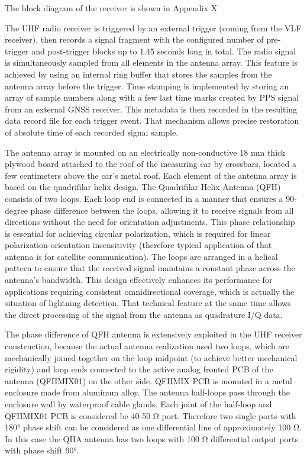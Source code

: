 The block diagram of the receiver is shown in Appendix X


The UHF radio receiver is triggered by an external trigger (coming from the VLF receiver), then records a signal fragment with the configured number of pre-trigger and post-trigger blocks up to 1.45 seconds long in total. The radio signal is simultaneously sampled from all elements in the antenna array. This feature is achieved by using an internal ring buffer that stores the samples from the antenna array before the trigger. Time stamping is implemented by storing an array of sample numbers along with a few last time marks created by PPS signal from an external GNSS receiver. This metadata is then recorded in the resulting data record file for each trigger event. That mechanism allows precise restoration of absolute time of each recorded signal sample. 

The antenna array is mounted on an electrically non-conductive 18 mm thick plywood board attached to the roof of the measuring car by crossbars, located a few centimeters above the car’s metal roof. Each element of the antenna array is based on the quadrifilar helix design. The Quadrifilar Helix Antenna (QFH) consists of two loops. Each loop end is connected in a manner that ensures a 90-degree phase difference between the loops, allowing it to receive signals from all directions without the need for orientation adjustments. This phase relationship is essential for achieving circular polarization, which is required for linear polarization orientation insensitivity (therefore typical application of that antenna is for satellite communication). The loops are arranged in a helical pattern to ensure that the received signal maintains a constant phase across the antenna's bandwidth. This design effectively enhances its performance for applications requiring consistent omnidirectional coverage, which is actually the situation of  lightning detection. That technical feature at the same time allows the direct processing of the signal from the antenna as quadrature I/Q data. 

The phase difference of QFH antenna is extensively exploited in the UHF receiver construction, because the actual antenna realization used two loops, which are mechanically joined together on the loop midpoint (to achieve better mechanical rigidity) and loop ends connected to the active analog fronted PCB of the antenna (QFHMIX01) on the other side. QFHMIX PCB is mounted in a metal enclosure made from aluminum alloy. The antenna half-loops pass through the enclosure wall by waterproof cable glands. Each joint of the half-loop and QFHMIX01 PCB is considered be 40-50 Ω port. Therefore two single ports with 180° phase shift can be considered as one differential line of approximately 100 Ω. In this case the QHA antenna has two loops with 100 Ω differential output ports with phase shift 90°. 

